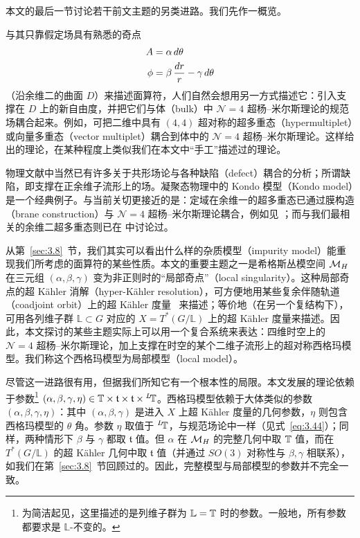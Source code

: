 本文的最后一节讨论若干前文主题的另类进路。我们先作一概览。

与其只靠假定场具有熟悉的奇点
\setcounter{equation}{0}
\begin{equation}\label{eq:6.1}
  \begin{aligned}A & =  \alpha \,d\theta \\
\phi & = \beta\,{dr\over r}-\gamma\,d\theta\end{aligned}
\end{equation}
（沿余维二的曲面 $D$）来描述面算符，人们自然会想用另一方式描述它：引入支撑在 $D$ 上的新自由度，并把它们与体（bulk）中 ${\mathcal N}=4$ 超杨–米尔斯理论的规范场耦合起来。例如，可把二维中具有 $(4,4)$ 超对称的超多重态（hypermultiplet）或向量多重态（vector multiplet）耦合到体中的 ${\mathcal N}=4$ 超杨–米尔斯理论。这样给出的理论，在某种程度上类似我们在本文中“手工”描述过的理论。

物理文献中当然已有许多关于共形场论与各种缺陷（defect）耦合的分析；所谓缺陷，即支撑在正余维子流形上的场。凝聚态物理中的 Kondo 模型（Kondo model）是一个经典例子。与当前关切更接近的是：定域在余维一的超多重态已通过膜构造（brane construction）与 ${\mathcal N}=4$ 超杨–米尔斯理论耦合，例如见 \cite{ref78,ref79}；而与我们最相关的余维二超多重态则已在 \cite{ref18} 中讨论过。

{}从第~\ref{sec:3.8}~节，我们其实可以看出什么样的杂质模型（impurity model）能重现我们所考虑的面算符的某些性质。本文的重要主题之一是希格斯丛模空间 ${{\mathcal{M}}_H}$ 在三元组 $(\alpha,\beta,\gamma)$ 变为非正则时的“局部奇点”（local singularity）。这种局部奇点的超 Kähler 消解（hyper-Kähler resolution），可方便地用某些复余伴随轨道（coadjoint orbit）上的超 Kähler 度量~\cite{ref34} 来描述；等价地（在另一个复结构下），可用各列维子群 $\mathbb{L}\subset G$ 对应的 $X=T^*(G/\mathbb{L})$ 上的超 Kähler 度量来描述。因此，本文探讨的某些主题实际上可以用一个复合系统来表达：四维时空上的 ${\mathcal N}=4$ 超杨–米尔斯理论，加上支撑在时空的某个二维子流形上的超对称西格玛模型。我们称这个西格玛模型为局部模型（local model）。

尽管这一进路很有用，但据我们所知它有一个根本性的局限。本文发展的理论依赖于参数\footnote{为简洁起见，这里描述的是列维子群为 $\mathbb{L}={\mathbb{T}}$ 时的参数。一般地，所有参数都要求是 $\mathbb{L}$-不变的。} $(\alpha,\beta,\gamma,\eta)
\in {\mathbb{T}}\times \mathfrak t\times\mathfrak t\times {}^L\negthinspace{\mathbb{T}}$。西格玛模型依赖于大体类似的参数 $(\alpha,\beta,\gamma,\eta)$：其中 $(\alpha,\beta,\gamma)$ 是进入 $X$ 上超 Kähler 度量的几何参数，$\eta$ 则包含西格玛模型的 $\theta$ 角。参数 $\eta$ 取值于 $^L\negthinspace{\mathbb{T}}$，与规范场论中一样（见式~\eqref{eq:3.44}）；同样，两种情形下 $\beta$ 与 $\gamma$ 都取 $\mathfrak t$ 值。但 $\alpha$ 在 ${{\mathcal{M}}_H}$ 的完整几何中取 ${\mathbb{T}}$ 值，而在 $T^*(G/\mathbb{L})$ 的超 Kähler 几何中取 $\mathfrak t$ 值（并通过 $SO(3)$ 对称性与 $\beta,\gamma$ 相联系），如我们在第~\ref{sec:3.8}~节回顾过的。因此，完整模型与局部模型的参数并不完全一致。

